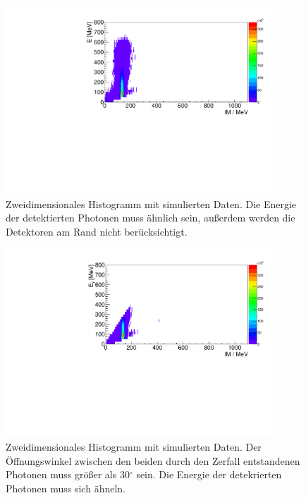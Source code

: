 \documentclass[a4paper,11pt,oneside,final,german,openbib,pdftex]{scrbook}
\begin{document}
{\begin{appendix}
\begin{figure}[h!]
	\begin{center}
		\includegraphics[width=100mm]{NewCalib/20171904Sim30DegreeCut}
		\caption[Simulation: 2D-Hist; Ohne Detektoren am Rand]{Zweidimensionales Histogramm mit simulierten Daten. Die Energie der detektierten Photonen muss \"ahnlich sein, au{\ss}erdem werden die Detektoren am Rand nicht ber\"ucksichtigt.}
		\label{fig:Sim-Data-2DHist-30-Degree-Edge}
	\end{center}
\end{figure}




\begin{figure}[h!]
	\begin{center}
		\includegraphics[width=100mm]{20170505MinOpeningAngle2DHist}
		\caption[Simulation: 2D-Hist \"Offnungswinkel muss gr\"o{\ss}er als 30$^{\circ}$ sein.]{Zweidimensionales Histogramm mit simulierten Daten. Der \"Offnungswinkel zwischen den beiden durch den Zerfall entstandenen Photonen muss gr\"o{\ss}er als 30$^{\circ}$ sein. Die Energie der detekrierten Photonen muss sich \"ahneln.}
		\label{fig;2D-Hist-Min-OpeningAngle}
	\end{center}
\end{figure}







\end{appendix}}
\end{document}
